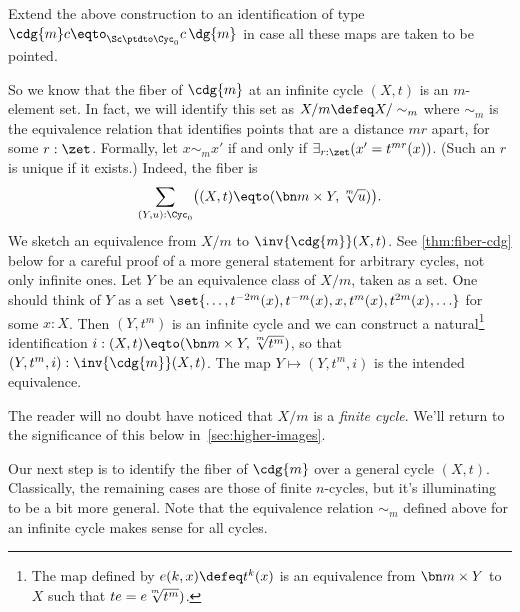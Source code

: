\begin{xca}\label{xca:pointed-maps-circle}
Extend the above construction to an identification of type $\cdg{m}c\eqto_{\Sc\ptdto\Cyc_0}c\,\dg{m}$ 
in case all these maps are taken to be pointed.
\end{xca}

So we know that the fiber of $\cdg{m}$ at an infinite cycle $(X,t)$
is an $m$-element set. In fact, we will identify this set as
$X/m \defeq X/\sim_m$ where $\sim_m$ is the equivalence relation that
identifies points that are a distance $mr$ apart, for some $r:\zet$.
Formally, let $x\sim_m x'$ if and only if $\exists_{r:\zet}(x'=t^{mr}(x))$.
(Such an $r$ is unique if it exists.)
Indeed, the fiber is
\[
  \sum_{(Y,u):\Cyc_0}\bigl((X,t) \eqto (\bn m\times Y, \sqrt[\uproot{2}m]{u})\bigr).
\]
We sketch an equivalence from $X/m$ to $\inv{\cdg{m}}(X,t)$.
See \cref{thm:fiber-cdg} below for a careful proof of a 
more general statement for arbitrary cycles, not only infinite ones.
Let $Y$ be an equivalence class of $X/m$, taken as a set. 
One should think of $Y$ as a set 
$\set{\ldots,t^{-2m}(x),t^{-m}(x),x,t^m(x),t^{2m}(x),\ldots}$
for some $x:X$. Then $(Y,t^m)$ is an infinite cycle and we can construct a
natural\footnote{%
The map defined by $e(k,x)\defeq t^k(x)$ is an equivalence from
$\bn m\times Y$ to $X$ such that $te=e\sqrt[\uproot{2}m]{t^m})$.}
identification $i:(X,t) \eqto (\bn m\times Y, \sqrt[\uproot{2}m]{t^m})$,
so that $(Y,t^m,i): \inv{\cdg{m}}(X,t)$. The map $Y\mapsto(Y,t^m,i)$
is the intended equivalence. 

The reader will no doubt have noticed that $X/m$ is a \emph{finite cycle}.
We'll return to the significance of this below in~\cref{sec:higher-images}.

Our next step is to identify the fiber of $\cdg{m}$ over a general cycle $(X,t)$.
Classically, the remaining cases are those of finite $n$-cycles,
but it's illuminating to be a bit more general.
Note that the equivalence relation $\sim_m$ defined above for an infinite cycle
makes sense for all cycles.

